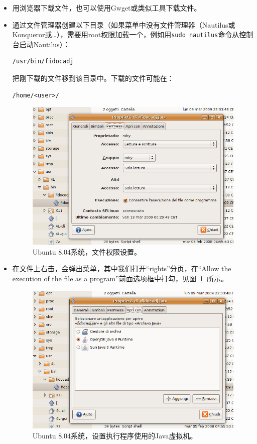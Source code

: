 \documentclass[10pt,a4paper,twoside]{scrreprt}
\begin{document}
\begin{itemize}
\item{用浏览器下载文件，也可以使用Gwget或类似工具下载文件。}

\item{通过文件管理器创建以下目录（如果菜单中没有文件管理器（Nautilus或Konqueror或\dots），需要用root权限加载一个，例如用\lstinline!sudo nautilus!命令从控制台启动Nautilus）：
\begin{lstlisting}
/usr/bin/fidocadj
\end{lstlisting}
把刚下载的文件移到该目录中。下载的文件可能在：
\begin{lstlisting}
/home/<user>/
\end{lstlisting}}

\begin{figure}
\centering
\includegraphics[width=.8\textwidth]{permessi}
\caption{Ubuntu 8.04系统，文件权限设置。}
\label{fig_permessi}
\end{figure}

\item{在文件上右击，会弹出菜单，其中我们打开“rights”分页，在“Allow the execution of the file as a program”前面选项框中打勾，见图~\ref{fig_permessi}~所示。}

\begin{figure}
\centering
\includegraphics[width=.8\textwidth]{java6}
\caption{Ubuntu 8.04系统，设置执行程序使用的Java虚拟机。}
\label{fig_java6}
\end{figure}


\end{itemize}
\end{document}
